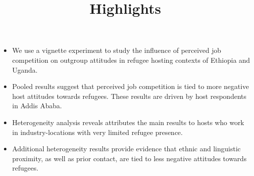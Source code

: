 \documentclass[12pt]{article}
\begin{document}
\title{\textbf{Highlights}}
\author{}
\date{} %
\maketitle

\vspace{-1cm} %

\begin{itemize}
    \item We use a vignette experiment to study the influence of perceived job competition on outgroup attitudes in refugee hosting contexts of Ethiopia and Uganda.
    \item Pooled results suggest that perceived job competition is tied to more negative host attitudes towards refugees. These results are driven by host respondents in Addis Ababa.
    \item Heterogeneity analysis reveals attributes the main results to hosts who work in industry-locations with very limited refugee presence.
    \item Additional heterogeneity results provide evidence that ethnic and linguistic proximity, as well as prior contact, are tied to less negative attitudes towards refugees.
\end{itemize}
\end{document}
